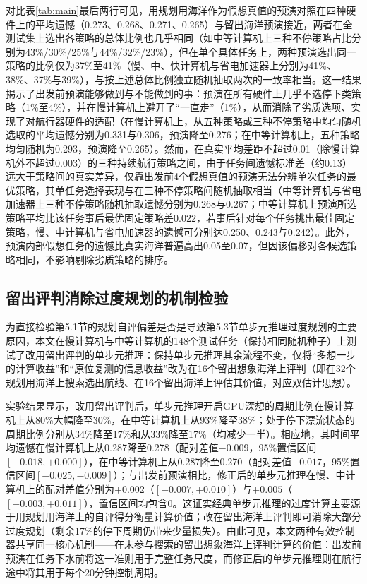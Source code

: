 对比表\ref{tab:main}最后两行可见，用规划用海洋作为假想真值的预演对照在四种硬件上的平均遗憾（0.273、0.268、0.271、0.265）与留出海洋预演接近，两者在全测试集上选出各策略的总体比例也几乎相同（如中等计算机上三种不停策略占比分别为43\%/30\%/25\%与44\%/32\%/23\%），但在单个具体任务上，两种预演选出同一策略的比例仅为37\%至41\%（慢、中、快计算机与省电加速器上分别为41\%、38\%、37\%与39\%），与按上述总体比例独立随机抽取两次的一致率相当。这一结果揭示了出发前预演能够做到与不能做到的事：预演在所有硬件上几乎不选停下类策略（1\%至4\%），并在慢计算机上避开了“一直走”（1\%），从而消除了劣质选项、实现了对航行器硬件的适配（在慢计算机上，从五种策略或三种不停策略中均匀随机选取的平均遗憾分别为0.331与0.306，预演降至0.276；在中等计算机上，五种策略均匀随机为0.293，预演降至0.265）。然而，在真实平均差距不超过0.01（除慢计算机外不超过0.003）的三种持续航行策略之间，由于任务间遗憾标准差（约0.13）远大于策略间的真实差异，仅靠出发前4个假想真值的预演无法分辨单次任务的最优策略，其单任务选择表现与在三种不停策略间随机抽取相当（中等计算机与省电加速器上三种不停策略随机抽取遗憾分别为0.268与0.267；中等计算机上预演所选策略平均比该任务事后最优固定策略差0.022，若事后针对每个任务挑出最佳固定策略，慢、中计算机与省电加速器的遗憾可分别达0.250、0.243与0.242）。此外，预演内部假想任务的遗憾比真实海洋普遍高出0.05至0.07，但因该偏移对各候选策略相同，不影响剔除劣质策略的排序。

\subsection{留出评判消除过度规划的机制检验}

为直接检验第5.1节的规划自评偏差是否是导致第5.3节单步元推理过度规划的主要原因，本文在慢计算机与中等计算机的148个测试任务（保持相同随机种子）上测试了改用留出评判的单步元推理：保持单步元推理其余流程不变，仅将“多想一步的计算收益”和“原位复测的信息收益”改为在16个留出想象海洋上评判（即在32个规划用海洋上搜索选出航线、在16个留出海洋上评估其价值，对应双估计思想\cite{vanhasselt2010double}）。

实验结果显示，改用留出评判后，单步元推理开启GPU深想的周期比例在慢计算机上从80\%大幅降至30\%，在中等计算机上从93\%降至38\%；处于停下漂流状态的周期比例分别从34\%降至17\%和从33\%降至17\%（均减少一半）。相应地，其时间平均遗憾在慢计算机上从0.287降至0.278（配对差值$-0.009$，95\%置信区间$[-0.018, +0.000]$），在中等计算机上从0.287降至0.270（配对差值$-0.017$，95\%置信区间$[-0.025, -0.009]$）；与出发前预演相比，修正后的单步元推理在慢、中计算机上的配对差值分别为$+0.002$（$[-0.007, +0.010]$）与$+0.005$（$[-0.003, +0.011]$），置信区间均包含0。这证实经典单步元推理的过度计算主要源于用规划用海洋上的自评得分衡量计算价值；改在留出海洋上评判即可消除大部分过度规划（剩余17\%的停下周期仍带来少量损失）。由此可见，本文两种有效控制器共享同一核心机制——在未参与搜索的留出想象海洋上评判计算的价值：出发前预演在任务下水前将这一准则用于完整任务尺度，而修正后的单步元推理则在航行途中将其用于每个20分钟控制周期。


